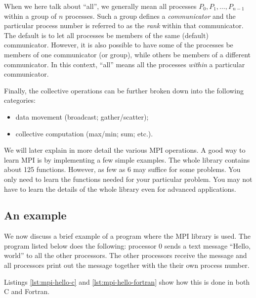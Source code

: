 When we here talk about ``all'', we generally mean all processes $P_0, P_1,
\ldots, P_{n-1}$ within a group of $n$ processes. Such a group defines a
\emph{communicator} and the particular process number is referred to as the
\emph{rank} within that communicator. The default is to let all processes be
members of the same (default) communicator. However, it is also possible to have
some of the processes be members of one communicator (or group), while others be
members of a different communicator. In this context, ``all'' means all the
processes \emph{within} a particular communicator.

Finally, the collective operations can be further broken down into the
following categories:
\begin{itemize}
\item data movement (broadcast; gather/scatter);
\item collective computation (max/min; sum; etc.).
\end{itemize}

We will later explain in more detail the various MPI operations. A good way to
learn MPI is by implementing a few simple examples. The whole library contains
about 125 functions. However, as few as 6 may suffice for some problems. You
only need to learn the functions needed for your particular problem. You may not
have to learn the details of the whole library even for advanced applications.

\subsection{An example}

We now discuss a brief example of a program where the MPI library is used. The
program listed below does the following: processor 0 sends a text message
``Hello, world'' to all the other processors. The other processors receive the
message and all processors print out the message together with the their own
process number.

Listings \ref{lst:mpi-hello-c} and \ref{lst:mpi-hello-fortran} show how this is
done in both C and Fortran.

